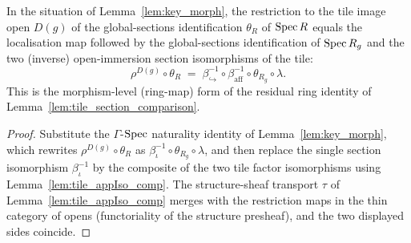 \begin{lemma}\leanok
  \label{lem:tile_section_ring_identity}
  In the situation of Lemma~\ref{lem:key_morph}, the restriction to the tile image open \(D(g)\) of the
  global-sections identification \(\theta_R\) of \(\operatorname{Spec} R\) equals the localisation map followed by the
  global-sections identification of \(\operatorname{Spec} R_g\) and the two (inverse) open-immersion section
  isomorphisms of the tile:
  \[
    \rho^{D(g)} \circ \theta_R
    \;=\;
    \beta_{\hookrightarrow}^{-1} \circ \beta_{\mathrm{aff}}^{-1} \circ \theta_{R_g} \circ \lambda.
  \]
  This is the morphism-level (ring-map) form of the residual ring identity of
  Lemma~\ref{lem:tile_section_comparison}.
\end{lemma}
\begin{proof}
  \leanok
  Substitute the \(\Gamma\)-\(\operatorname{Spec}\) naturality identity of Lemma~\ref{lem:key_morph}, which rewrites
  \(\rho^{D(g)} \circ \theta_R\) as \(\beta_\iota^{-1} \circ \theta_{R_g} \circ \lambda\), and then
  replace the single section isomorphism \(\beta_\iota^{-1}\) by the composite of the two tile factor
  isomorphisms using Lemma~\ref{lem:tile_appIso_comp}. The structure-sheaf transport \(\tau\) of
  Lemma~\ref{lem:tile_appIso_comp} merges with the restriction maps in the thin category of opens
  (functoriality of the structure presheaf), and the two displayed sides coincide.
\end{proof}

